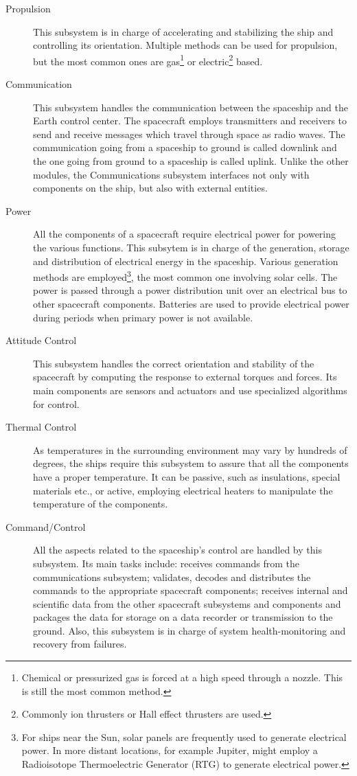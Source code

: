 \begin{description}
  \item[Propulsion] This subsystem is in charge of accelerating and stabilizing
  the ship and controlling its orientation. Multiple methods can be used for
  propulsion, but the most common ones are gas\footnote{Chemical or pressurized
  gas is forced at a high speed through a nozzle. This is still the most common
  method.} or electric\footnote{Commonly ion thrusters or Hall effect thrusters
  are used.} based.
  \item[Communication] This subsystem handles the communication between the
  spaceship and the Earth control center. The spacecraft employs transmitters
  and receivers to send and receive messages which travel through space as radio
  waves. The communication going from a spaceship to ground is called downlink
  and the one going from ground to a spaceship is called uplink. Unlike the
  other modules, the Communications subsystem interfaces not only with
  components on the ship, but also with external entities.
  \item[Power] All the components of a spacecraft require electrical
  power for powering the various functions. This subsytem is in charge of the
  generation, storage and distribution of electrical energy in the spaceship.
  Various generation methods are employed\footnote{ For ships near the Sun,
  solar panels are frequently used to generate electrical power. In more distant
  locations, for example Jupiter, might employ a Radioisotope Thermoelectric
  Generator (RTG) to generate electrical power.}, the most common one involving
  solar cells. The power is passed through a power distribution unit over an
  electrical bus to other spacecraft components. Batteries are used to provide
  electrical power during periods when primary power is not available.
  \item[Attitude Control] This subsystem handles the correct orientation and
  stability of the spacecraft by computing the response to external torques and
  forces. Its main components are sensors and actuators and use specialized
  algorithms for control.
  \item[Thermal Control] As temperatures in the surrounding environment may vary
  by hundreds of degrees, the ships require this subsystem to assure that all
  the components have a proper temperature. It can be passive, such as
  insulations, special materials etc., or active, employing electrical heaters
  to manipulate the temperature of the components.
  \item[Command/Control] All the aspects related to the spaceship's control are
  handled by this subsystem. Its main tasks include: receives commands from
  the communications subsystem; validates, decodes and distributes the commands
  to the appropriate spacecraft components; receives internal and scientific
  data from the other spacecraft subsystems and components and packages the data
  for storage on a data recorder or transmission to the ground. Also, this
  subsystem is in charge of system health-monitoring and recovery from failures.
\end{description}

